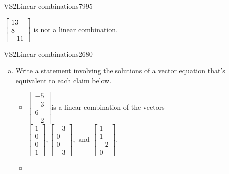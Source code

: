 \begin{exercise}{VS2}{Linear combinations}{7995}
\begin{exerciseAnswer}
\begin{itemize}
 

 \(\left[\begin{array}{c}
13 \\
8 \\
-11
\end{array}\right]\) is not a linear combination. 

 
\end{itemize}

     \end{exerciseAnswer}
 \end{exercise}


\begin{exercise}{VS2}{Linear combinations}{2680} 
\begin{exerciseStatement} 

\begin{enumerate}[(a)]
\item  

 Write a statement involving the solutions of a vector equation that's equivalent to each claim below. 

 

\begin{itemize}
\item  

 \(\left[\begin{array}{c}
-5 \\
-3 \\
6 \\
-2
\end{array}\right]\)is a linear combination of the vectors \(\left[\begin{array}{c}
1 \\
0 \\
0 \\
1
\end{array}\right] , \left[\begin{array}{c}
-3 \\
0 \\
0 \\
-3
\end{array}\right] , \text{ and } \left[\begin{array}{c}
1 \\
1 \\
-2 \\
0
\end{array}\right]\). 

 
\item  


\end{itemize}
\end{enumerate}
\end{exerciseStatement}
\end{exercise}
